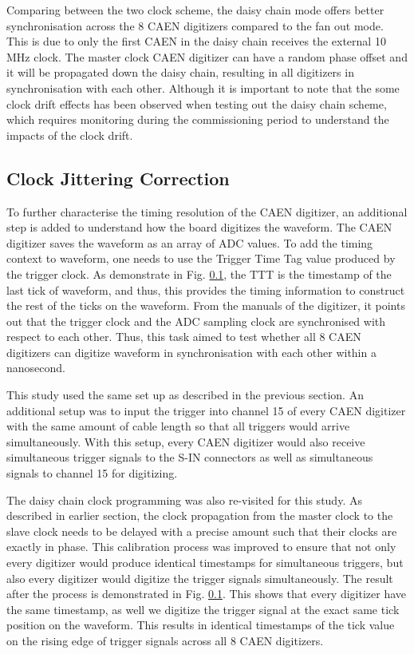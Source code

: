 Comparing between the two clock scheme, the daisy chain mode offers better synchronisation across the 8 CAEN digitizers compared to the fan out mode.
This is due to only the first CAEN in the daisy chain receives the external 10 MHz clock.
The master clock CAEN digitizer can have a random phase offset and it will be propagated down the daisy chain, resulting in all digitizers in synchronisation with each other.
Although it is important to note that the some clock drift effects has been observed when testing out the daisy chain scheme, which requires monitoring during the commissioning period to understand the impacts of the clock drift.

\subsection{Clock Jittering Correction}

To further characterise the timing resolution of the CAEN digitizer, an additional step is added to understand how the board digitizes the waveform.
The CAEN digitizer saves the waveform as an array of ADC values.
To add the timing context to waveform, one needs to use the Trigger Time Tag value produced by the trigger clock.
As demonstrate in Fig. \ref{}, the TTT is the timestamp of the last tick of waveform, and thus, this provides the timing information to construct the rest of the ticks on the waveform.
From the manuals of the digitizer, it points out that the trigger clock and the ADC sampling clock are synchronised with respect to each other.
Thus, this task aimed to test whether all 8 CAEN digitizers can digitize waveform in synchronisation with each other within a nanosecond. 

This study used the same set up as described in the previous section.
An additional setup was to input the trigger into channel 15 of every CAEN digitizer with the same amount of cable length so that all triggers would arrive simultaneously.
With this setup, every CAEN digitizer would also receive simultaneous trigger signals to the S-IN connectors as well as simultaneous signals to channel 15 for digitizing.

The daisy chain clock programming was also re-visited for this study.
As described in earlier section, the clock propagation from the master clock to the slave clock needs to be delayed with a precise amount such that their clocks are exactly in phase.
This calibration process was improved to ensure that not only every digitizer would produce identical timestamps for simultaneous triggers, but also every digitizer would digitize the trigger signals simultaneously.
The result after the process is demonstrated in Fig. \ref{}.
This shows that every digitizer have the same timestamp, as well we digitize the trigger signal at the exact same tick position on the waveform.
This results in identical timestamps of the tick value on the rising edge of trigger signals across all 8 CAEN digitizers.

